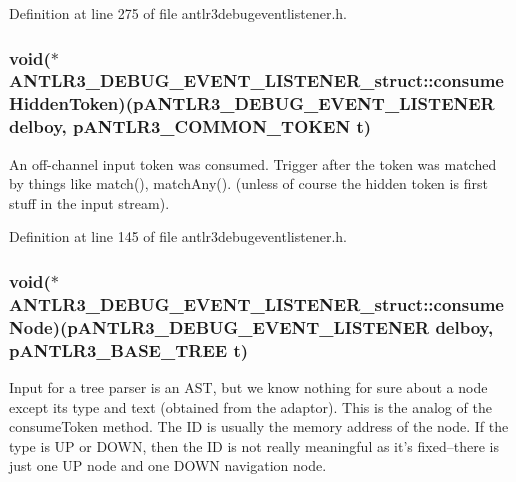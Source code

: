Definition at line 275 of file antlr3debugeventlistener.\-h.

\hypertarget{struct_a_n_t_l_r3___d_e_b_u_g___e_v_e_n_t___l_i_s_t_e_n_e_r__struct_aeebd35a1758f4bd8a1ebe87a754181ec}{
\subsubsection[{consume\-Hidden\-Token}]{\setlength{\rightskip}{0pt plus 5cm}void($\ast$ A\-N\-T\-L\-R3\-\_\-\-D\-E\-B\-U\-G\-\_\-\-E\-V\-E\-N\-T\-\_\-\-L\-I\-S\-T\-E\-N\-E\-R\-\_\-struct\-::consume\-Hidden\-Token)({\bf p\-A\-N\-T\-L\-R3\-\_\-\-D\-E\-B\-U\-G\-\_\-\-E\-V\-E\-N\-T\-\_\-\-L\-I\-S\-T\-E\-N\-E\-R} delboy, {\bf p\-A\-N\-T\-L\-R3\-\_\-\-C\-O\-M\-M\-O\-N\-\_\-\-T\-O\-K\-E\-N} {\bf t})}}\label{struct_a_n_t_l_r3___d_e_b_u_g___e_v_e_n_t___l_i_s_t_e_n_e_r__struct_aeebd35a1758f4bd8a1ebe87a754181ec}
An off-\/channel input token was consumed. Trigger after the token was matched by things like match(), match\-Any(). (unless of course the hidden token is first stuff in the input stream). 

Definition at line 145 of file antlr3debugeventlistener.\-h.

\hypertarget{struct_a_n_t_l_r3___d_e_b_u_g___e_v_e_n_t___l_i_s_t_e_n_e_r__struct_ab69667e7adf4eb6f3ada9e47a851402b}{
\subsubsection[{consume\-Node}]{\setlength{\rightskip}{0pt plus 5cm}void($\ast$ A\-N\-T\-L\-R3\-\_\-\-D\-E\-B\-U\-G\-\_\-\-E\-V\-E\-N\-T\-\_\-\-L\-I\-S\-T\-E\-N\-E\-R\-\_\-struct\-::consume\-Node)({\bf p\-A\-N\-T\-L\-R3\-\_\-\-D\-E\-B\-U\-G\-\_\-\-E\-V\-E\-N\-T\-\_\-\-L\-I\-S\-T\-E\-N\-E\-R} delboy, {\bf p\-A\-N\-T\-L\-R3\-\_\-\-B\-A\-S\-E\-\_\-\-T\-R\-E\-E} {\bf t})}}\label{struct_a_n_t_l_r3___d_e_b_u_g___e_v_e_n_t___l_i_s_t_e_n_e_r__struct_ab69667e7adf4eb6f3ada9e47a851402b}
Input for a tree parser is an A\-S\-T, but we know nothing for sure about a node except its type and text (obtained from the adaptor). This is the analog of the consume\-Token method. The I\-D is usually the memory address of the node. If the type is U\-P or D\-O\-W\-N, then the I\-D is not really meaningful as it's fixed--there is just one U\-P node and one D\-O\-W\-N navigation node.

